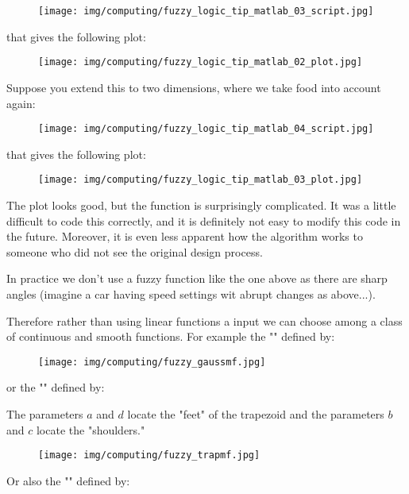 	\begin{tcolorbox}[colframe=black,colback=white,sharp corners]
	\begin{figure}[H]
		\centering
		\texttt{[image: img/computing/fuzzy\_logic\_tip\_matlab\_03\_script.jpg]}
	\end{figure}
	that gives the following plot:
	\begin{figure}[H]
		\centering
		\texttt{[image: img/computing/fuzzy\_logic\_tip\_matlab\_02\_plot.jpg]}
	\end{figure}
	Suppose you extend this to two dimensions, where we take food into account again:
	\begin{figure}[H]
		\centering
		\texttt{[image: img/computing/fuzzy\_logic\_tip\_matlab\_04\_script.jpg]}
	\end{figure}
	that gives the following plot:
	\end{tcolorbox}
	
	\begin{tcolorbox}[colframe=black,colback=white,sharp corners]
	
	\begin{figure}[H]
		\centering
		\texttt{[image: img/computing/fuzzy\_logic\_tip\_matlab\_03\_plot.jpg]}
	\end{figure}
	The plot looks good, but the function is surprisingly complicated. It was a little difficult to code this correctly, and it is definitely not easy to modify this code in the future. Moreover, it is even less apparent how the algorithm works to someone who did not see the original design process.
	\end{tcolorbox}
	In practice we don't use a fuzzy function like the one above as there are sharp angles (imagine a car having speed settings wit abrupt changes as above...).
	
	Therefore rather than using linear functions a input we can choose among a class of continuous and smooth functions. For example the "" defined by:
	
	\begin{figure}[H]
		\centering
		\texttt{[image: img/computing/fuzzy\_gaussmf.jpg]}
	\end{figure}
	or the "" defined by:
	
	The parameters $a$ and $d$ locate the "feet" of the trapezoid and the parameters $b$ and $c$ locate the "shoulders."
	\begin{figure}[H]
		\centering
		\texttt{[image: img/computing/fuzzy\_trapmf.jpg]}
	\end{figure}
	Or also the "" defined by:
	
